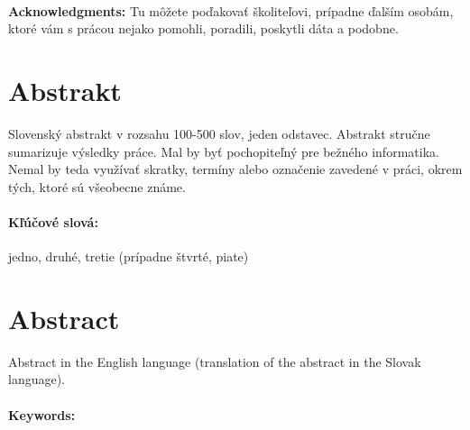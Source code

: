 \documentclass[12pt, twoside]{book}
\begin{document}




\newpage
\pagestyle{plain}
~

\vfill
{\bf Acknowledgments:} Tu môžete poďakovať školiteľovi, prípadne
ďalším osobám, ktoré vám s prácou nejako pomohli, poradili,
poskytli dáta a podobne.


\newpage 
\section*{Abstrakt}


Slovenský abstrakt v rozsahu 100-500 slov, jeden odstavec. Abstrakt
stručne sumarizuje výsledky práce. Mal by byť pochopiteľný pre bežného
informatika. Nemal by teda využívať skratky, termíny alebo označenie
zavedené v práci, okrem tých, ktoré sú všeobecne známe.

\paragraph*{Kľúčové slová:} jedno, druhé, tretie (prípadne štvrté, piate)


\newpage 
\section*{Abstract}

Abstract in the English language (translation of the abstract in the
Slovak language).


\paragraph*{Keywords:} 


%
%
%
%
\end{document}
